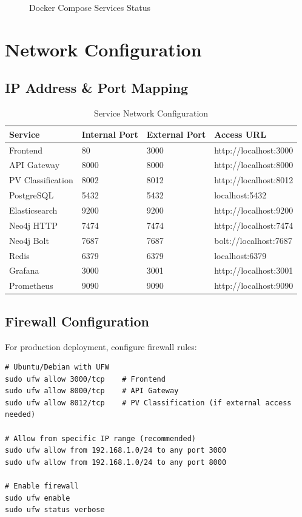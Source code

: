 \documentclass[11pt,a4paper,twoside]{book}
\begin{document}
\begin{figure}[h]
\centering
{}
\caption{Docker Compose Services Status}
\label{fig:docker-ps}
\end{figure}

\section{Network Configuration}

\subsection{IP Address \& Port Mapping}

\begin{table}[h]
\centering
\caption{Service Network Configuration}
\begin{tabularx}{\textwidth}{lllX}
\toprule
\textbf{Service} & \textbf{Internal Port} & \textbf{External Port} & \textbf{Access URL} \\
\midrule
Frontend & 80 & 3000 & http://localhost:3000 \\
API Gateway & 8000 & 8000 & http://localhost:8000 \\
PV Classification & 8002 & 8012 & http://localhost:8012 \\
PostgreSQL & 5432 & 5432 & localhost:5432 \\
Elasticsearch & 9200 & 9200 & http://localhost:9200 \\
Neo4j HTTP & 7474 & 7474 & http://localhost:7474 \\
Neo4j Bolt & 7687 & 7687 & bolt://localhost:7687 \\
Redis & 6379 & 6379 & localhost:6379 \\
Grafana & 3000 & 3001 & http://localhost:3001 \\
Prometheus & 9090 & 9090 & http://localhost:9090 \\
\bottomrule
\end{tabularx}
\end{table}

\subsection{Firewall Configuration}

For production deployment, configure firewall rules:

\begin{commandbox}
\begin{lstlisting}[style=bashstyle]
# Ubuntu/Debian with UFW
sudo ufw allow 3000/tcp    # Frontend
sudo ufw allow 8000/tcp    # API Gateway
sudo ufw allow 8012/tcp    # PV Classification (if external access needed)

# Allow from specific IP range (recommended)
sudo ufw allow from 192.168.1.0/24 to any port 3000
sudo ufw allow from 192.168.1.0/24 to any port 8000

# Enable firewall
sudo ufw enable
sudo ufw status verbose
\end{lstlisting}
\end{commandbox}
\end{document}
